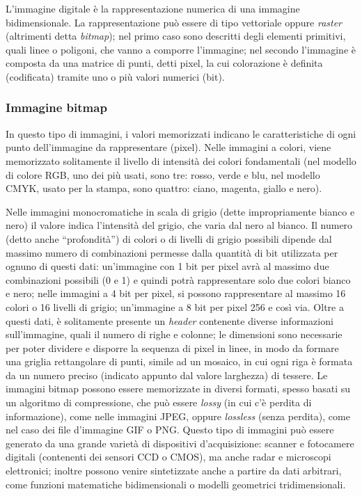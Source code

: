 L'immagine digitale è la rappresentazione numerica di una immagine
bidimensionale. La rappresentazione può essere di tipo vettoriale oppure
\emph{raster} (altrimenti detta \emph{bitmap}); nel primo caso sono descritti degli elementi
primitivi, quali linee o poligoni, che vanno a comporre l'immagine; nel
secondo l'immagine è composta da una matrice di punti, detti pixel, la cui
colorazione è definita (codificata) tramite uno o più valori numerici (bit).

\subsubsection{Immagine bitmap}

In questo tipo di immagini, i valori memorizzati indicano le caratteristiche
di ogni punto dell'immagine da rappresentare (pixel). Nelle immagini a colori,
viene memorizzato solitamente il livello di intensità dei colori fondamentali
(nel modello di colore RGB, uno dei più usati, sono tre: rosso, verde e blu, nel modello CMYK, usato per la stampa, sono quattro: ciano, magenta, giallo e nero).

Nelle immagini monocromatiche in scala di grigio (dette impropriamente bianco e nero) il valore indica l'intensità del grigio, che varia dal nero al bianco. Il numero (detto anche
``profondità'') di colori o di livelli di grigio possibili dipende dal massimo
numero di combinazioni permesse dalla quantità di bit utilizzata per ognuno di
questi dati: un'immagine con 1 bit per pixel avrà al massimo due combinazioni
possibili (0 e 1) e quindi potrà rappresentare solo due colori bianco e
nero; nelle immagini a 4 bit per pixel, si possono rappresentare al massimo 16
colori o 16 livelli di grigio; un'immagine a 8 bit per pixel 256 e così via.
Oltre a questi dati, è solitamente presente un \emph{header} contenente diverse
informazioni sull'immagine, quali il numero di righe e colonne;
le dimensioni sono necessarie per poter dividere e disporre la sequenza di
pixel in linee, in modo da formare una griglia rettangolare di punti, simile
ad un mosaico, in cui ogni riga è formata da un numero preciso (indicato
appunto dal valore larghezza) di tessere. Le immagini bitmap
possono essere memorizzate in diversi formati, spesso basati su un algoritmo
di compressione, che può essere \emph{lossy} (in cui c'è perdita di informazione),
come nelle immagini JPEG, oppure \emph{lossless} (senza perdita), come nel caso dei
file d'immagine GIF o PNG. Questo tipo di immagini può essere generato da una
grande varietà di dispositivi d'acquisizione: scanner e fotocamere digitali
(contenenti dei sensori CCD o CMOS), ma anche radar e microscopi
elettronici; inoltre possono venire sintetizzate anche a partire da dati
arbitrari, come funzioni matematiche bidimensionali o modelli geometrici
tridimensionali.


